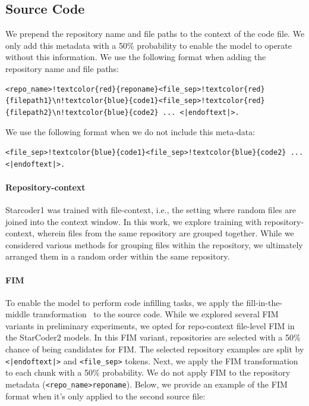\documentclass[10pt]{article} %
\begin{document}
\subsection{Source Code}
\label{subsec:source_code}
We prepend the repository name and file paths to the context of the code file. We only add this metadata with a 50\% probability to enable the model to operate without this information. We use the following format when adding the repository name and file paths:
\begin{Verbatim}[commandchars=!\{\}]
<repo_name>!textcolor{red}{reponame}<file_sep>!textcolor{red}{filepath1}\n!textcolor{blue}{code1}<file_sep>!textcolor{red}{filepath2}\n!textcolor{blue}{code2} ... <|endoftext|>.
\end{Verbatim}
We use the following format when we do not include this meta-data:
    \begin{Verbatim}[commandchars=!\{\}]
<file_sep>!textcolor{blue}{code1}<file_sep>!textcolor{blue}{code2} ... <|endoftext|>.
\end{Verbatim}

\paragraph{Repository-context} Starcoder1 was trained with file-context, i.e., the setting where random files are joined into the context window. In this work, we explore training with repository-context, wherein files from the same repository are grouped together. While we considered various methods for grouping files within the repository, we ultimately arranged them in a random order within the same repository.

\paragraph{FIM} 
To enable the model to perform code infilling tasks, we apply the fill-in-the-middle transformation~\citep[FIM;][]{bavarian2022fim} to the source code. While we explored several FIM variants in preliminary experiments, we opted for repo-context file-level FIM in the StarCoder2 models.
In this FIM variant, repositories are selected with a 50\% chance of being candidates for FIM.
The selected repository examples are split by \verb!<|endoftext|>! and \verb|<file_sep>| tokens. Next, we apply the FIM transformation to each chunk with a 50\% probability. We do not apply FIM to the repository metadata (\verb|<repo_name>reponame|). Below, we provide an example of the FIM format when it's only applied to the second source file: 
\end{document}

